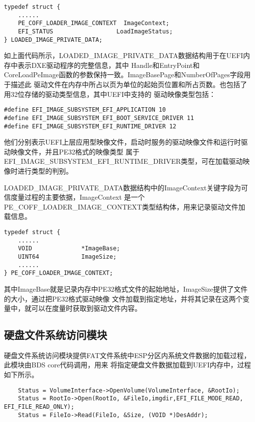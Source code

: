 \begin{lstlisting}
typedef struct {
    ......
    PE_COFF_LOADER_IMAGE_CONTEXT  ImageContext; 
    EFI_STATUS                  LoadImageStatus;
} LOADED_IMAGE_PRIVATE_DATA;
\end{lstlisting}

如上面代码所示，LOADED\_IMAGE\_PRIVATE\_DATA数据结构用于在UEFI内存中表示DXE驱动程序的完整信息，其中
Handle和EntryPoint和CoreLoadPeImage函数的参数保持一致。ImageBasePage和NumberOfPages字段用于描述此
驱动文件在内存中所占以页为单位的起始页位置和所占页数。也包括了用32位存储的驱动类型信息，其中UEFI中支持的
驱动映像类型包括：

\begin{lstlisting}
#define EFI_IMAGE_SUBSYSTEM_EFI_APPLICATION 10
#define EFI_IMAGE_SUBSYSTEM_EFI_BOOT_SERVICE_DRIVER 11
#define EFI_IMAGE_SUBSYSTEM_EFI_RUNTIME_DRIVER 12
\end{lstlisting}

他们分别表示UEFI上层应用型映像文件，启动时服务的驱动映像文件和运行时驱动映像文件，并且PE32格式的映像类型
属于EFI\_IMAGE\_SUBSYSTEM\_EFI\_RUNTIME\_DRIVER类型，可在加载驱动映像时进行类型的判别。
\par LOADED\_IMAGE\_PRIVATE\_DATA数据结构中的ImageContext关键字段为可信度量过程的主要依据，ImageContext
是一个PE\_COFF\_LOADER\_IMAGE\_CONTEXT类型结构体，用来记录驱动文件加载信息。

\begin{lstlisting}
typedef struct {
    ......
    VOID              *ImageBase;
    UINT64            ImageSize;
    ......
} PE_COFF_LOADER_IMAGE_CONTEXT;
\end{lstlisting}

其中ImageBase就是记录内存中PE32格式文件的起始地址，ImageSize提供了文件的大小，通过把PE32格式驱动映像
文件加载到指定地址，并将其记录在这两个变量中，就可以在度量时获取到驱动文件内容。

\subsection{硬盘文件系统访问模块}
硬盘文件系统访问模块提供FAT文件系统中ESP分区内系统文件数据的加载过程，此模块由BDS core代码调用，用来
将指定硬盘文件数据加载到UEFI内存中，过程如下所示。

\begin{lstlisting}
    Status = VolumeInterface->OpenVolume(VolumeInterface, &RootIo);
    Status = RootIo->Open(RootIo, &FileIo,imgdir,EFI_FILE_MODE_READ, EFI_FILE_READ_ONLY);
    Status = FileIo->Read(FileIo, &Size, (VOID *)DesAddr);
\end{lstlisting}

